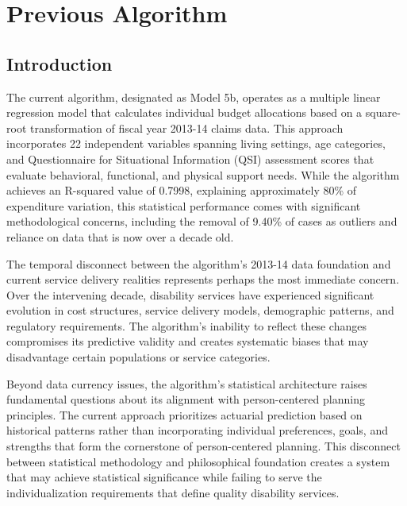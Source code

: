\chapter{Previous Algorithm}  \newpage

\section{Introduction}

The current algorithm, designated as Model 5b, operates as a multiple linear regression model that calculates individual budget allocations based on a square-root transformation of fiscal year 2013-14 claims data. This approach incorporates 22 independent variables spanning living settings, age categories, and Questionnaire for Situational Information (QSI) assessment scores that evaluate behavioral, functional, and physical support needs. While the algorithm achieves an R-squared value of 0.7998, explaining approximately 80\% of expenditure variation, this statistical performance comes with significant methodological concerns, including the removal of 9.40\% of cases as outliers and reliance on data that is now over a decade old.

The temporal disconnect between the algorithm's 2013-14 data foundation and current service delivery realities represents perhaps the most immediate concern. Over the intervening decade, disability services have experienced significant evolution in cost structures, service delivery models, demographic patterns, and regulatory requirements. The algorithm's inability to reflect these changes compromises its predictive validity and creates systematic biases that may disadvantage certain populations or service categories.

Beyond data currency issues, the algorithm's statistical architecture raises fundamental questions about its alignment with person-centered planning principles. The current approach prioritizes actuarial prediction based on historical patterns rather than incorporating individual preferences, goals, and strengths that form the cornerstone of person-centered planning. This disconnect between statistical methodology and philosophical foundation creates a system that may achieve statistical significance while failing to serve the individualization requirements that define quality disability services.


